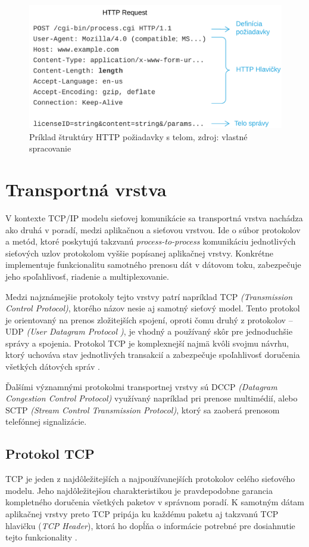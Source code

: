 \documentclass[
  printed, %
  table,   %
  lof,     %
  nolot,   %
  nocover
]{fithesis3}
\begin{document}
\begin{figure}[h]
  \centering
    \includegraphics[width=.97\textwidth]{images/net-http.png}
  \caption{Príklad štruktúry HTTP požiadavky s telom, zdroj: vlastné spracovanie}
  \label{fig:net-http}
\end{figure}

\section{Transportná vrstva}
V kontexte TCP/IP modelu sieťovej komunikácie sa transportná vrstva nachádza
ako druhá v poradí, medzi aplikačnou a sieťovou vrstvou. Ide o súbor protokolov
a metód, ktoré poskytujú takzvanú \textit{process-to-process} komunikáciu
jednotlivých sieťových uzlov protokolom vyššie popísanej aplikačnej vrstvy.
Konkrétne implementuje funkcionalitu samotného prenosu dát v dátovom toku,
zabezpečuje jeho spoľahlivosť, riadenie a multiplexovanie. 

Medzi najznámejšie protokoly tejto vrstvy patrí napríklad TCP
\textit{(Transmission Control Protocol)}, ktorého názov nesie aj samotný
sieťový model. Tento protokol je orientovaný na prenos zložitejších spojení,
oproti čomu druhý z protokolov -- UDP \textit{(User Datagram Protocol )}, je
vhodný a používaný skôr pre jednoduchšie správy a spojenia. Protokol TCP je
komplexnejší najmä kvôli svojmu návrhu, ktorý uchováva stav jednotlivých
transakcií a zabezpečuje spoľahlivosť doručenia všetkých dátových správ \cite{rfc1122}. 

Ďalšími
významnými protokolmi transportnej vrstvy sú DCCP
\textit{(Datagram Congestion Control Protocol)} využívaný napríklad pri prenose
multimédií, alebo SCTP \textit{(Stream Control Transmission Protocol)}, ktorý
sa zaoberá prenosom telefónnej signalizácie.

\subsection{Protokol TCP}
TCP je jeden z najdôležitejších a najpoužívanejších protokolov celého sieťového
modelu. Jeho najdôležitejšou charakteristikou je
pravdepodobne garancia kompletného doručenia všetkých paketov v správnom
poradí. K samotným dátam aplikačnej vrstvy preto TCP pripája ku každému paketu
aj takzvanú TCP hlavičku (\textit{TCP Header}), ktorá ho dopĺňa o informácie
potrebné pre dosiahnutie tejto funkcionality \cite{FIDIS:TCP}.
\end{document}
